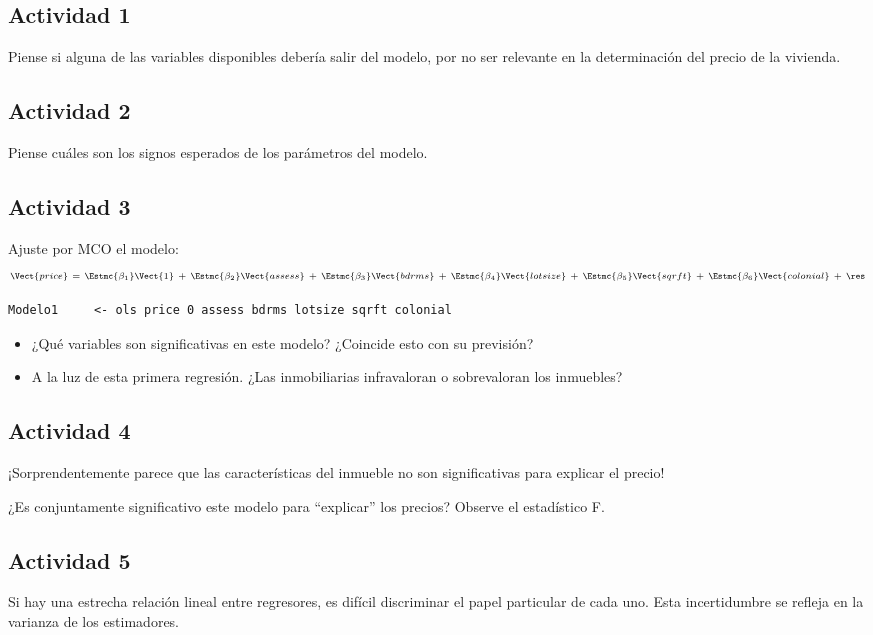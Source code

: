 \documentclass[11pt]{article}
\begin{document}
\subsection{Actividad 1}
\label{sec:orgf7d87e7}
Piense si alguna de las variables disponibles debería salir del
modelo, por no ser relevante en la determinación del precio de la
vivienda.
\subsection{Actividad 2}
\label{sec:org40468cd}
Piense cuáles son los signos esperados de los parámetros del modelo.

\subsection{Actividad 3}
\label{sec:orgab38ba5}
Ajuste por MCO el modelo:
\begin{displaymath}
  \scriptstyle
  \Vect{price}\ = \
       \Estmc{\beta_1}\Vect{1}
  \ +\ \Estmc{\beta_2}\Vect{assess}
  \ +\ \Estmc{\beta_3}\Vect{bdrms}
  \ +\ \Estmc{\beta_4}\Vect{lotsize}
  \ +\ \Estmc{\beta_5}\Vect{sqrft}
  \ +\ \Estmc{\beta_6}\Vect{colonial}
  \ +\ \res
\end{displaymath}

{\vspace{0pt} \color{gray!70!black}
\begin{verbatim}
Modelo1     <- ols price 0 assess bdrms lotsize sqrft colonial
\end{verbatim}
}

\begin{itemize}
\item ¿Qué variables son significativas en este modelo?  ¿Coincide esto con su previsión?
\item A la luz de esta primera regresión. ¿Las inmobiliarias infravaloran o sobrevaloran los inmuebles?
\end{itemize}

\subsection{Actividad 4}
\label{sec:orgbf0a016}
¡Sorprendentemente parece que las características del inmueble no son
significativas para explicar el precio!

¿Es conjuntamente significativo este modelo para ``explicar'' los
precios? Observe el estadístico F.

\subsection{Actividad 5}
\label{sec:org5d09456}
Si hay una estrecha relación lineal entre regresores, es difícil
discriminar el papel particular de cada uno. Esta incertidumbre se
refleja en la varianza de los estimadores.
\end{document}
